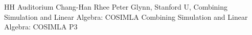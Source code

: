 \tablePlenary{} %
{HH Auditorium}	%
{Chang-Han Rhee}		%
{Peter Glynn, Stanford U, Combining Simulation and Linear Algebra: COSIMLA}	%
{Combining Simulation and Linear Algebra: COSIMLA}		%
{P3}		%
\\\hline
